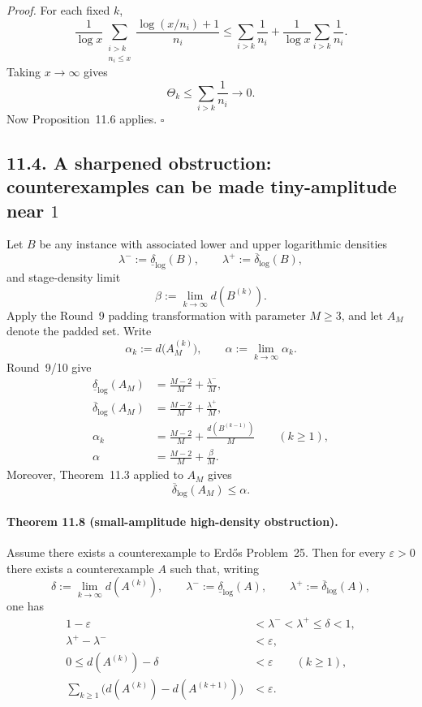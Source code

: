 \emph{Proof.}
For each fixed $k$,
\[
\frac1{\log x}
\sum_{\substack{i>k\\ n_i\le x}}
\frac{\log(x/n_i)+1}{n_i}
\le
\sum_{i>k}\frac1{n_i}
+
\frac1{\log x}\sum_{i>k}\frac1{n_i}.
\]
Taking $x\to\infty$ gives
\[
\Theta_k\le \sum_{i>k}\frac1{n_i}\to 0.
\]
Now Proposition~11.6 applies. \hfill $\square$

\subsection*{11.4. A sharpened obstruction: counterexamples can be made tiny-amplitude near $1$}
Let $B$ be any instance with associated lower and upper logarithmic densities
\[
\lambda^-:=\underline\delta_{\log}(B),
\qquad
\lambda^+:=\overline\delta_{\log}(B),
\]
and stage-density limit
\[
\beta:=\lim_{k\to\infty} d(B^{(k)}).
\]
Apply the Round~9 padding transformation with parameter $M\ge 3$, and let $A_M$ denote the padded set.  Write
\[
\alpha_k:=d\bigl(A_M^{(k)}\bigr),
\qquad
\alpha:=\lim_{k\to\infty}\alpha_k.
\]
Round~9/10 give
\begin{align}
\underline\delta_{\log}(A_M)&=\frac{M-2}{M}+\frac{\lambda^-}{M},
\tag{11.20}\\
\overline\delta_{\log}(A_M)&=\frac{M-2}{M}+\frac{\lambda^+}{M},
\tag{11.21}\\
\alpha_k&=\frac{M-2}{M}+\frac{d(B^{(k-1)})}{M}
\qquad (k\ge 1),
\tag{11.22}\\
\alpha&=\frac{M-2}{M}+\frac{\beta}{M}.
\tag{11.23}
\end{align}
Moreover, Theorem~11.3 applied to $A_M$ gives
\begin{equation}
\overline\delta_{\log}(A_M)\le \alpha.
\tag{11.24}
\end{equation}

\paragraph{Theorem 11.8 (small-amplitude high-density obstruction).}
Assume there exists a counterexample to Erd\H{o}s Problem~25.  Then for every $\varepsilon>0$ there exists a counterexample $A$ such that, writing
\[
\delta:=\lim_{k\to\infty} d(A^{(k)}),
\qquad
\lambda^-:=\underline\delta_{\log}(A),
\qquad
\lambda^+:=\overline\delta_{\log}(A),
\]
one has
\begin{align}
1-\varepsilon&<\lambda^-<\lambda^+\le \delta<1,
\tag{11.25}\\
\lambda^+-\lambda^-&<\varepsilon,
\tag{11.26}\\
0\le d(A^{(k)})-\delta&<\varepsilon
\qquad (k\ge 1),
\tag{11.27}\\
\sum_{k\ge 1}\bigl(d(A^{(k)})-d(A^{(k+1)})\bigr)&<\varepsilon.
\tag{11.28}
\end{align}

